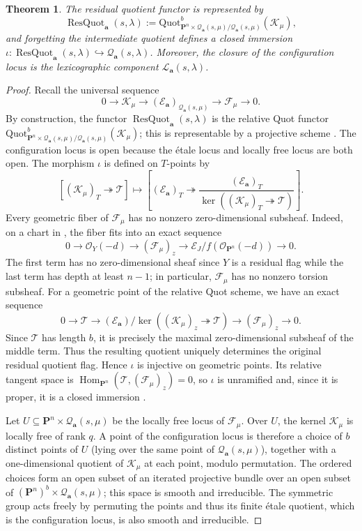 \documentclass[leqno,11pt,a4paper]{amsart}
\newtheorem{thm}{Theorem}[section]
\theoremstyle{definition}
\numberwithin{equation}{section}
\newcommand{\bfa}{\mathbf{a}}
\newcommand{\Quot}{\mathrm{Quot}}
\newcommand{\PP}{\mathbf{P}}
\newcommand{\EE}{\mathscr{E}}
\newcommand{\FF}{\mathscr{F}}
\newcommand{\OO}{\mathscr{O}}
\newcommand{\KK}{\mathscr{K}}
\newcommand{\LL}{\mathcal{L}}
\newcommand{\QQ}{\mathcal{Q}}
\DeclareMathOperator{\Hom}{Hom}
\DeclareMathOperator{\ResQuot}{ResQuot}
\begin{document}
\begin{thm} \label{residual_quot} The residual quotient functor is represented by
$$\ResQuot_{\bfa}(s,\lambda) := \Quot^b_{\PP^n\times \QQ_{\bfa}(s,\mu)/\QQ_{\bfa}(s,\mu)}(\KK_\mu),$$
and forgetting the intermediate quotient defines a closed immersion
$\iota:\ResQuot_{\bfa}(s,\lambda) \hookrightarrow\QQ_{\bfa}(s,\lambda)$.
Moreover, the closure of the configuration locus is  the lexicographic component $\LL_{\bfa}(s,\lambda)$.
\end{thm}

\begin{proof}
Recall the universal sequence 
$$
0 \longrightarrow \KK_\mu \longrightarrow (\EE_\bfa)_{\QQ_{\bfa}(s,\mu)} \longrightarrow \FF_\mu \longrightarrow 0.
$$
By construction, the functor $\ResQuot_{\bfa}(s,\lambda)$ is the relative Quot functor $\Quot^b_{\PP^n\times \QQ_{\bfa}(s,\mu)/\QQ_{\bfa}(s,\mu)}(\KK_\mu)$; this is representable by a projective scheme \cite[Theorem~2.2.4]{HL}. 
The configuration locus is open because the \'etale locus and locally free locus are both open.
The morphism $\iota$ is defined on $T$-points by
$$
[(\KK_\mu)_T \twoheadrightarrow \mathscr{T}] \mapsto
\left[
(\EE_{\bfa})_T\twoheadrightarrow
\frac{(\EE_{\bfa})_T}
{\ker((\KK_\mu)_T\twoheadrightarrow \mathscr{T})}
\right].
$$
Every geometric fiber of $\FF_\mu$ has no nonzero zero-dimensional subsheaf.
Indeed, on a chart in , the fiber fits into an exact sequence
$$
0 \to \OO_Y(-d) \to (\FF_\mu)_z \to \EE_J/f(\OO_{\PP^n}(-d)) \to 0.
$$
The first term has no zero-dimensional sheaf since $Y$ is a residual flag while the last term has depth at least $n-1$; in particular, $\FF_\mu$ has no nonzero torsion subsheaf.
For a geometric point of the relative Quot scheme, we have an exact sequence
$$
0 \longrightarrow \mathscr{T} 
\longrightarrow (\EE_{\bfa})/\ker( (\KK_\mu)_z \twoheadrightarrow \mathscr{T}) 
\longrightarrow (\FF_\mu)_z \longrightarrow0.
$$
Since $\mathscr{T}$ has length $b$, it is precisely the maximal zero-dimensional subsheaf of the middle
term. Thus the resulting quotient uniquely determines the original residual quotient flag.
Hence $\iota$ is injective on geometric points. 
Its relative tangent space is $\Hom_{\PP^n}(\mathscr{T}, (\FF_\mu)_z)=0$, so $\iota$ is unramified and, since it is proper, it is a closed immersion \cite[Tag~04XV]{stacks_project}.


Let $U\subseteq \PP^n \times \QQ_{\bfa}(s,\mu)$ be the locally free locus of $\FF_\mu$. 
Over $U$, the kernel $\KK_\mu$ is locally free of rank $q$. 
A point of the configuration locus is therefore a choice of $b$ distinct points of $U$ (lying over the same point of $\QQ_{\bfa}(s,\mu)$), together
with a one-dimensional quotient of $\KK_\mu$ at each point, modulo permutation. 	
The ordered choices form an open subset of an iterated projective bundle over an open subset of $(\PP^n)^b\times \QQ_{\bfa}(s,\mu)$; this space is smooth and irreducible. 
The symmetric group acts freely by permuting the points and thus its finite \'etale quotient, which is the configuration locus, is also smooth and irreducible.


\end{proof}
\end{document}
